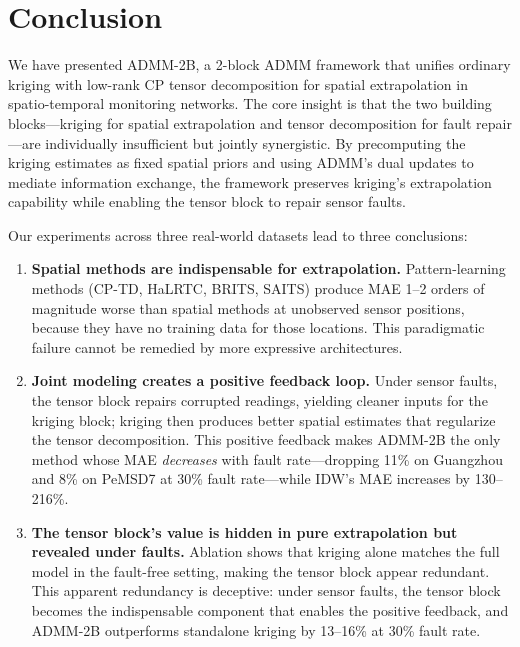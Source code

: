 \documentclass[journal]{IEEEtran}
\begin{document}
\section{Conclusion}\label{sec:conclusion}

We have presented ADMM-2B, a 2-block ADMM framework that unifies ordinary kriging with low-rank CP tensor decomposition for spatial extrapolation in spatio-temporal monitoring networks. The core insight is that the two building blocks---kriging for spatial extrapolation and tensor decomposition for fault repair---are individually insufficient but jointly synergistic. By precomputing the kriging estimates as fixed spatial priors and using ADMM's dual updates to mediate information exchange, the framework preserves kriging's extrapolation capability while enabling the tensor block to repair sensor faults.

Our experiments across three real-world datasets lead to three conclusions:

\begin{enumerate}
\item \textbf{Spatial methods are indispensable for extrapolation.} Pattern-learning methods (CP-TD, HaLRTC, BRITS, SAITS) produce MAE 1--2 orders of magnitude worse than spatial methods at unobserved sensor positions, because they have no training data for those locations. This paradigmatic failure cannot be remedied by more expressive architectures.

\item \textbf{Joint modeling creates a positive feedback loop.} Under sensor faults, the tensor block repairs corrupted readings, yielding cleaner inputs for the kriging block; kriging then produces better spatial estimates that regularize the tensor decomposition. This positive feedback makes ADMM-2B the only method whose MAE \emph{decreases} with fault rate---dropping 11\% on Guangzhou and 8\% on PeMSD7 at 30\% fault rate---while IDW's MAE increases by 130--216\%.

\item \textbf{The tensor block's value is hidden in pure extrapolation but revealed under faults.} Ablation shows that kriging alone matches the full model in the fault-free setting, making the tensor block appear redundant. This apparent redundancy is deceptive: under sensor faults, the tensor block becomes the indispensable component that enables the positive feedback, and ADMM-2B outperforms standalone kriging by 13--16\% at 30\% fault rate.
\end{enumerate}
\end{document}
